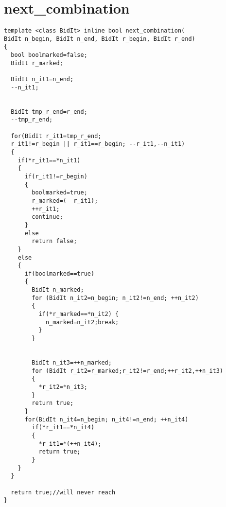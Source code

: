 \section{next\_combination}
\label{app:nextcombination}
\begin{verbatim}
template <class BidIt> inline bool next_combination(
BidIt n_begin, BidIt n_end, BidIt r_begin, BidIt r_end)
{
  bool boolmarked=false;
  BidIt r_marked;

  BidIt n_it1=n_end;
  --n_it1;


  BidIt tmp_r_end=r_end;
  --tmp_r_end;

  for(BidIt r_it1=tmp_r_end;
  r_it1!=r_begin || r_it1==r_begin; --r_it1,--n_it1)
  {
    if(*r_it1==*n_it1)
    { 
      if(r_it1!=r_begin)
      {
        boolmarked=true;
        r_marked=(--r_it1);
        ++r_it1;
        continue;
      }
      else
        return false;    
    }
    else
    {
      if(boolmarked==true)
      {
        BidIt n_marked;
        for (BidIt n_it2=n_begin; n_it2!=n_end; ++n_it2)
        {
          if(*r_marked==*n_it2) {
            n_marked=n_it2;break;
          }
        }


        BidIt n_it3=++n_marked;  
        for (BidIt r_it2=r_marked;r_it2!=r_end;++r_it2,++n_it3)
        {
          *r_it2=*n_it3;
        }
        return true;
      }
      for(BidIt n_it4=n_begin; n_it4!=n_end; ++n_it4)
        if(*r_it1==*n_it4)
        {
          *r_it1=*(++n_it4);
          return true;       
        }
    }
  }  

  return true;//will never reach
}
\end{verbatim}

